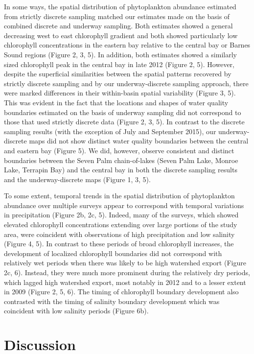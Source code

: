 \documentclass[review]{elsarticle}
\begin{document}
In some ways, the spatial distribution of phytoplankton abundance estimated from strictly discrete sampling matched our estimates made on the basis of combined discrete and underway sampling. Both estimates showed a general decreasing west to east chlorophyll gradient and both showed particularly low chlorophyll concentrations in the eastern bay relative to the central bay or Barnes Sound regions (Figure 2, 3, 5). In addition, both estimates showed a similarly sized chlorophyll peak in the central bay in late 2012 (Figure 2, 5). However, despite the superficial similarities between the spatial patterns recovered by strictly discrete sampling and by our underway-discrete sampling approach, there were marked differences in their within-basin spatial variability (Figure 3, 5). This was evident in the fact that the locations and shapes of water quality boundaries estimated on the basis of underway sampling did not correspond to those that used strictly discrete data (Figure 2, 3, 5). In contrast to the discrete sampling results (with the exception of July and September 2015), our underway-discrete maps did not show distinct water quality boundaries between the central and eastern bay (Figure 5). We did, however, observe consistent and distinct boundaries between the Seven Palm chain-of-lakes (Seven Palm Lake, Monroe Lake, Terrapin Bay) and the central bay in both the discrete sampling results and the underway-discrete maps (Figure 1, 3, 5). 

To some extent, temporal trends in the spatial distribution of phytoplankton abundance over multiple surveys appear to correspond with temporal variations in precipitation (Figure 2b, 2c, 5). Indeed, many of the surveys, which showed elevated chlorophyll concentrations extending over large portions of the study area, were coincident with observations of high precipitation and low salinity (Figure 4, 5). In contrast to these periods of broad chlorophyll increases, the development of localized chlorophyll boundaries did not correspond with relatively wet periods when there was likely to be high watershed export (Figure 2c, 6). Instead, they were much more prominent during the relatively dry periods, which lagged high watershed export, most notably in 2012 and to a lesser extent in 2009 (Figure 2, 5, 6). The timing of chlorophyll boundary development also contrasted with the timing of salinity boundary development which was coincident with low salinity periods (Figure 6b).

\section{Discussion}
\end{document}
